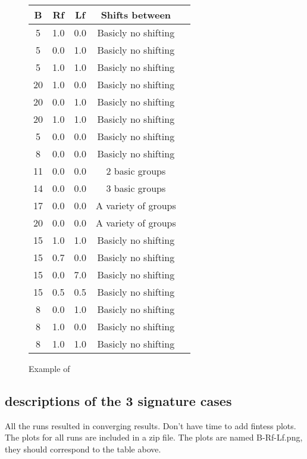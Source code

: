 \documentclass[11pt]{article}
\begin{document}
\begin{figure}[ht]

\begin{tabular}{c|c|c|c|c}
\hline\hline
B & Rf & Lf & Shifts between \\
\hline
5 & 1.0 & 0.0 &  Basicly no shifting\\
5 & 0.0 & 1.0 &  Basicly no shifting\\
5 & 1.0 & 1.0 &  Basicly no shifting\\
\hline
20 & 1.0 & 0.0 &  Basicly no shifting\\
20 & 0.0 & 1.0 &  Basicly no shifting\\
20 & 1.0 & 1.0 &  Basicly no shifting\\
\hline
5 & 0.0 & 0.0 & Basicly no shifting \\
8 & 0.0 & 0.0 & Basicly no shifting \\
11 & 0.0 & 0.0 & 2 basic groups \\
14 & 0.0 & 0.0 & 3 basic groups \\
17 & 0.0 & 0.0 &  A variety of groups\\
20 & 0.0 & 0.0 & A variety of groups\\
\hline
15 & 1.0 & 1.0 &  Basicly no shifting\\
15 & 0.7 & 0.0 &  Basicly no shifting\\
15 & 0.0 & 7.0 &  Basicly no shifting\\
15 & 0.5 & 0.5 &  Basicly no shifting\\
\hline
8 & 0.0 & 1.0 &  Basicly no shifting\\
8 & 1.0 & 0.0 &  Basicly no shifting\\
8 & 1.0 & 1.0 &  Basicly no shifting\\
\hline
\end{tabular}

\caption{Example of }
\label{fig:1}
\end{figure}

\subsection*{descriptions of the 3 signature cases}

All the runs resulted in converging results.
Don't have time to add fintess plots. The plots for
all runs are included in a zip file.
The plots are named {B-Rf-Lf}.png, they should correspond
to the table above.
\end{document}
